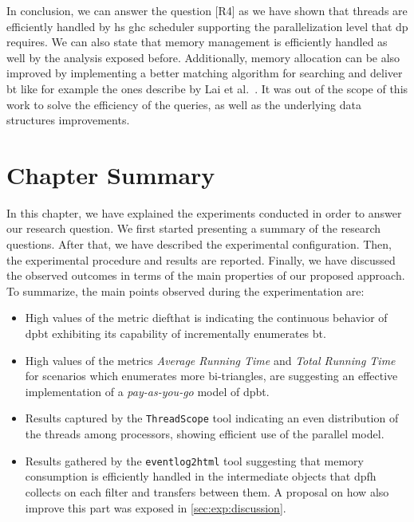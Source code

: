 In conclusion, we can answer the question [R4] as we have shown that threads are efficiently handled by \acrshort{hs} \acrshort{ghc} scheduler supporting the parallelization level that \acrshort{dp} requires. 
We can also state that memory management is efficiently handled as well by the analysis exposed before.
Additionally, memory allocation can be also improved by implementing a better matching algorithm for searching and deliver \acrshort{bt} like for example the ones describe by Lai et al.~\cite{Lai}. 
It was out of the scope of this work to solve the efficiency of the queries, as well as the underlying data structures improvements. 


\section{Chapter Summary}
In this chapter, we have explained the experiments conducted in order to answer our research question.
We first started presenting a summary of the research questions. After that, we have described the experimental configuration.
Then, the experimental procedure and results are reported. Finally, we have discussed the observed outcomes in terms of the main properties of our proposed approach.
To summarize, the main points observed during the experimentation are:
\begin{itemize}
  \item High values of the metric dief\@t that is indicating the continuous behavior of \acrshort{dpbt} exhibiting its capability of incrementally enumerates \acrshort{bt}.
  \item High values of the metrics \emph{Average Running Time} and \emph{Total Running Time} for scenarios which enumerates more bi-triangles, are suggesting an effective implementation of a \emph{pay-as-you-go} model of \acrshort{dpbt}.
  \item Results captured by the \texttt{ThreadScope} tool indicating an even distribution of the threads among processors, showing efficient use of the parallel model.
  \item Results gathered by the \texttt{eventlog2html} tool suggesting that memory consumption is efficiently handled in the intermediate objects that \acrshort{dpfh} collects on each filter and transfers between them. A proposal on how also improve this part was exposed in \autoref{sec:exp:discussion}.
\end{itemize} 
